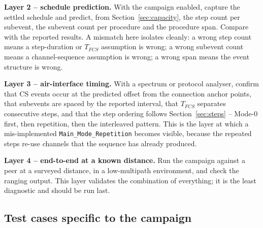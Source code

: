 \documentclass[11pt,a4paper]{article}
\newcommand{\code}[1]{\texttt{\small #1}}
\newcommand{\Tfcs}{T_{FCS}}
\begin{document}
\textbf{Layer 2 -- schedule prediction.} With the campaign enabled, capture the settled schedule and
predict, from Section~\ref{sec:capacity}, the step count per subevent, the subevent count per
procedure and the procedure span. Compare with the reported results. A mismatch here isolates cleanly:
a wrong step count means a step-duration or $\Tfcs$ assumption is wrong; a wrong subevent count means
a channel-sequence assumption is wrong; a wrong span means the event structure is wrong.

\textbf{Layer 3 -- air-interface timing.} With a spectrum or protocol analyser, confirm that CS events
occur at the predicted offset from the connection anchor points, that subevents are spaced by the
reported interval, that $\Tfcs$ separates consecutive steps, and that the step ordering follows
Section~\ref{sec:steps} -- Mode-0 first, then repetition, then the interleaved pattern. This is the
layer at which a mis-implemented \code{Main\_Mode\_Repetition} becomes visible, because the repeated
steps re-use channels that the sequence has already produced.

\textbf{Layer 4 -- end-to-end at a known distance.} Run the campaign against a peer at a surveyed
distance, in a low-multipath environment, and check the ranging output. This layer validates the
combination of everything; it is the least diagnostic and should be run last.

\subsection{Test cases specific to the campaign}
\end{document}
